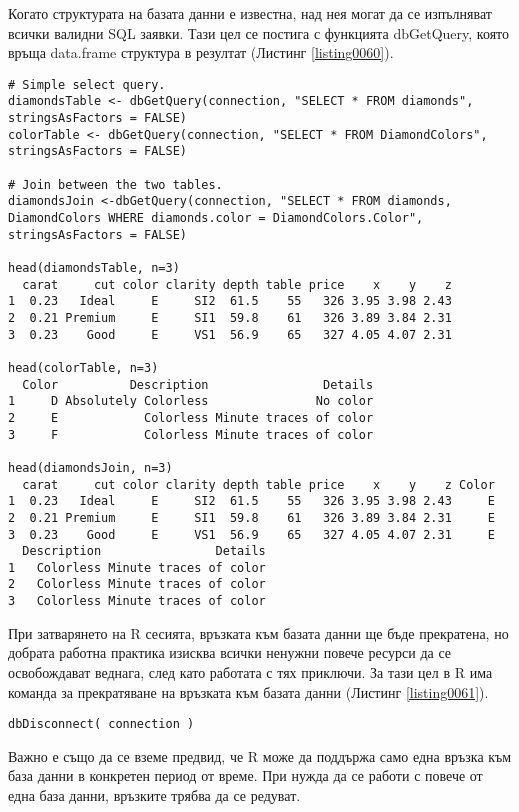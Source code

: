 Когато структурата на базата данни е известна, над нея могат да се изпълняват всички валидни SQL заявки. Тази цел се постига с функцията dbGetQuery, която връща data.frame структура в резултат (Листинг \ref{listing0060}).

\begin{lstlisting}[caption=Изследване на базата данни, label=listing0060]
# Simple select query.
diamondsTable <- dbGetQuery(connection, "SELECT * FROM diamonds", stringsAsFactors = FALSE)
colorTable <- dbGetQuery(connection, "SELECT * FROM DiamondColors", stringsAsFactors = FALSE)

# Join between the two tables.
diamondsJoin <-dbGetQuery(connection, "SELECT * FROM diamonds, DiamondColors WHERE diamonds.color = DiamondColors.Color", stringsAsFactors = FALSE)

head(diamondsTable, n=3)
  carat     cut color clarity depth table price    x    y    z
1  0.23   Ideal     E     SI2  61.5    55   326 3.95 3.98 2.43
2  0.21 Premium     E     SI1  59.8    61   326 3.89 3.84 2.31
3  0.23    Good     E     VS1  56.9    65   327 4.05 4.07 2.31
 
head(colorTable, n=3)
  Color          Description                Details
1     D Absolutely Colorless               No color
2     E            Colorless Minute traces of color
3     F            Colorless Minute traces of color

head(diamondsJoin, n=3)
  carat     cut color clarity depth table price    x    y    z Color
1  0.23   Ideal     E     SI2  61.5    55   326 3.95 3.98 2.43     E
2  0.21 Premium     E     SI1  59.8    61   326 3.89 3.84 2.31     E
3  0.23    Good     E     VS1  56.9    65   327 4.05 4.07 2.31     E
  Description                Details
1   Colorless Minute traces of color
2   Colorless Minute traces of color
3   Colorless Minute traces of color
\end{lstlisting}

При затварянето на R сесията, връзката към базата данни ще бъде прекратена, но добрата работна практика изисква всички ненужни повече ресурси да се освобождават веднага, след като работата с тях приключи. За тази цел в R има команда за прекратяване на връзката към базата данни (Листинг \ref{listing0061}).

\begin{lstlisting}[caption=Прекъсване на връзката към базата данни, label=listing0061]
dbDisconnect( connection )
\end{lstlisting}

Важно е също да се вземе предвид, че R може да поддържа само една връзка към база данни в конкретен период от време. При нужда да се работи с повече от една база данни, връзките трябва да се редуват.

